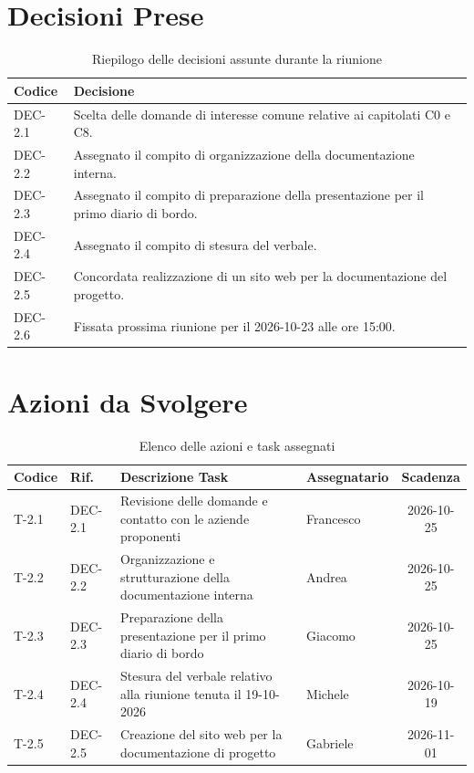 \documentclass[11pt, a4paper]{article}
\begin{document}
\clearpage

\section{Decisioni Prese}

\begin{table}[htbp]
\centering
\caption{Riepilogo delle decisioni assunte durante la riunione}
\label{tab:decisioni}
\begin{tabularx}{\textwidth}{l X}
\toprule
\textbf{Codice} & \textbf{Decisione} \\
\midrule
DEC-2.1 & Scelta delle domande di interesse comune relative ai capitolati C0 e C8. \\
DEC-2.2 & Assegnato il compito di organizzazione della documentazione interna. \\
DEC-2.3 & Assegnato il compito di preparazione della presentazione per il primo diario di bordo. \\
DEC-2.4 & Assegnato il compito di stesura del verbale. \\
DEC-2.5 & Concordata realizzazione di un sito web per la documentazione del progetto. \\
DEC-2.6 & Fissata prossima riunione per il 2026-10-23 alle ore 15:00. \\
\bottomrule
\end{tabularx}
\end{table}

\section{Azioni da Svolgere}

\begin{table}[htbp]
\centering
\caption{Elenco delle azioni e task assegnati}
\label{tab:azioni}
\begin{tabularx}{\textwidth}{l l X l c}
\toprule
\textbf{Codice} & \textbf{Rif.} & \textbf{Descrizione Task} & \textbf{Assegnatario} & \textbf{Scadenza} \\
\midrule
T-2.1 & DEC-2.1 & Revisione delle domande e contatto con le aziende proponenti & Francesco & 2026-10-25 \\
T-2.2 & DEC-2.2 & Organizzazione e strutturazione della documentazione interna & Andrea & 2026-10-25 \\
T-2.3 & DEC-2.3 & Preparazione della presentazione per il primo diario di bordo & Giacomo & 2026-10-25 \\
T-2.4 & DEC-2.4 & Stesura del verbale relativo alla riunione tenuta il 19-10-2026 & Michele & 2026-10-19 \\
T-2.5 & DEC-2.5 & Creazione del sito web per la documentazione di progetto & Gabriele & 2026-11-01 \\
\bottomrule
\end{tabularx}
\end{table}
\end{document}

